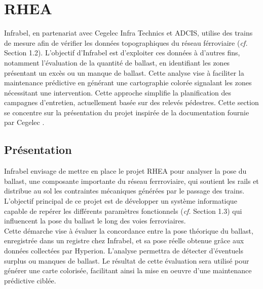 \section{RHEA}
Infrabel, en partenariat avec Cegelec Infra Technics et ADCIS, utilise des trains de mesure afin de vérifier les données topographiques du réseau férroviaire (\textit{cf.} Section 1.2). L'objectif d'Infrabel est d'exploiter ces données à d'autres fins, notamment l'évaluation de la quantité de ballast, en identifiant les zones présentant un excès ou un manque de ballast. Cette analyse vise à faciliter la maintenance prédictive en générant une cartographie colorée signalant les zones nécessitant une intervention. Cette approche simplifie la planification des campagnes d'entretien, actuellement basée sur des relevés pédestres. Cette section se concentre sur la présentation du projet inspirée de la documentation fournie par Cegelec \cite{RHEA}. 

\subsection{Présentation}
Infrabel envisage de mettre en place le projet RHEA pour analyser la pose du ballast, une composante importante du réseau ferrroviaire, qui soutient les rails et distribue au sol les contraintes mécaniques générées par le passage des trains. L'objectif principal de ce projet est de développer un système informatique capable de repérer les différents paramètres fonctionnels (\textit{cf.} Section 1.3) qui influencent la pose du ballast le long des voies ferroviaires.\\

Cette démarche vise à évaluer la concordance entre la pose théorique du ballast, enregistrée dans un registre chez Infrabel, et sa pose réelle obtenue grâce aux données collectées par Hyperion. L'analyse permettra de détecter d'éventuels surplus ou manques de ballast. Le résultat de cette évaluation sera utilisé pour générer une carte colorisée, facilitant ainsi la mise en oeuvre d'une maintenance prédictive ciblée. \\

